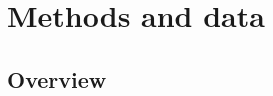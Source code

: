 \documentclass[final,3p,times,authoryear]{elsarticle}
\begin{document}







\section{Methods and data}\label{sec:validation}
\subsection{Overview}\label{sec:validationover}
\end{document}
